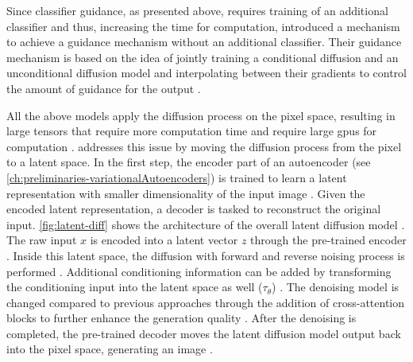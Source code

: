 Since classifier guidance, as presented above, requires training of an additional classifier and thus, increasing the time for computation, \cite{ho2022ClassifierFreeDiffusionGuidance}
introduced a mechanism to achieve a guidance mechanism without an additional classifier.  
Their guidance mechanism is based on the idea of jointly training a conditional diffusion and an unconditional diffusion model and interpolating between their gradients to control the amount of guidance for the output \cite{ho2022ClassifierFreeDiffusionGuidance}.

All the above models apply the diffusion process on the pixel space, resulting in large tensors that require more computation time and require large \glspl{gpu} for computation \cite{rombach2022HighResolutionImageSynthesis}.
\cite{rombach2022HighResolutionImageSynthesis} addresses this issue by moving the diffusion process from the pixel to a latent space.
In the first step, the encoder part of an autoencoder (see \autoref{ch:preliminaries-variationalAutoencoders}) is trained to learn a latent representation with smaller dimensionality of the input image \cite{rombach2022HighResolutionImageSynthesis}.
Given the encoded latent representation, a decoder is tasked to reconstruct the original input.
\autoref{fig:latent-diff} shows the architecture of the overall latent diffusion model \cite[Figure 3, p.4]{rombach2022HighResolutionImageSynthesis}.
The raw input $x$ is encoded into a latent vector $z$ through the pre-trained encoder \cite{rombach2022HighResolutionImageSynthesis}.
Inside this latent space, the diffusion with forward and reverse noising process is performed \cite{rombach2022HighResolutionImageSynthesis}.
Additional conditioning information can be added by transforming the conditioning input into the latent space as well ($\tau_\theta$) \cite{rombach2022HighResolutionImageSynthesis}.
The denoising model is changed compared to previous approaches through the addition of cross-attention blocks to further enhance the generation quality \cite{rombach2022HighResolutionImageSynthesis}.
After the denoising is completed, the pre-trained decoder moves the latent diffusion model output back into the pixel space, generating an image \cite{rombach2022HighResolutionImageSynthesis}.

